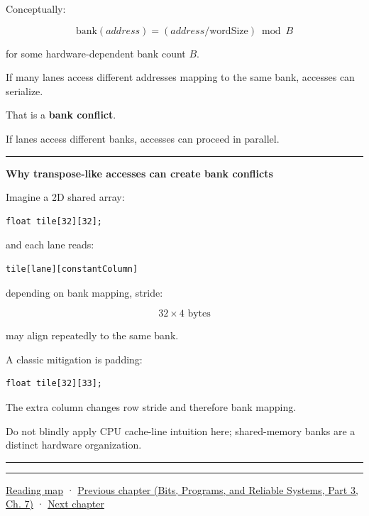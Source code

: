 Conceptually:

\[
\text{bank}(address)
=
(address/\text{wordSize})\bmod B
\]

for some hardware-dependent bank count \(B\).

If many lanes access different addresses mapping to the same bank, accesses can serialize.

That is a \textbf{bank conflict}.

If lanes access different banks, accesses can proceed in parallel.

\begin{center}\rule{0.5\linewidth}{0.5pt}\end{center}

\textbf{Why transpose-like accesses can create bank conflicts}

Imagine a 2D shared array:

\protect{}\label{32aupj}%
\begin{verbatim}
float tile[32][32];
\end{verbatim}

and each lane reads:

\protect{}\label{dov08i}%
\begin{verbatim}
tile[lane][constantColumn]
\end{verbatim}

depending on bank mapping, stride:

\[
32\times4\text{ bytes}
\]

may align repeatedly to the same bank.

A classic mitigation is padding:

\protect{}\label{ucsz3u}%
\begin{verbatim}
float tile[32][33];
\end{verbatim}

The extra column changes row stride and therefore bank mapping.

Do not blindly apply CPU cache-line intuition here; shared-memory banks are a distinct hardware organization.

\begin{center}\rule{0.5\linewidth}{0.5pt}\end{center}

\begin{center}\rule{0.5\linewidth}{0.5pt}\end{center}

\hyperref[volume-reading-map]{Reading map} · \href{../01-Bits-Programs-and-Reliable-Systems-P03/main.pdf\#01-foundations-i-ch007-typed-interfaces-identity-and-data-structures}{Previous chapter (Bits, Programs, and Reliable Systems, Part 3, Ch. 7)} · \hyperref[01-foundations-i-ch009-gpu-memory-divergence-atomics-and-ordering]{Next chapter}
